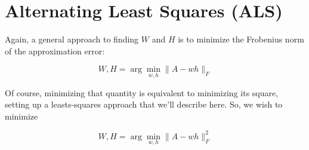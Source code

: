 % 
% 
% 
% 
% 
% 
% 
% 
% 
% 


\section{Alternating Least Squares (ALS)}

Again, a general approach to finding $W$ and $H$ is to minimize the
Frobenius norm of the approximation error:

\begin{equation}
\label{generalwh}
W,H = \arg \min_{w,h} \|A - wh\|_F
\end{equation}

Of course, minimizing that quantity is equivalent to minimizing its
square, setting up a leasts-squares approach that we'll describe here.
So, we wish to minimize

\begin{equation}
W,H = \arg \min_{w,h} \|A - wh\|_F^2
\end{equation}

